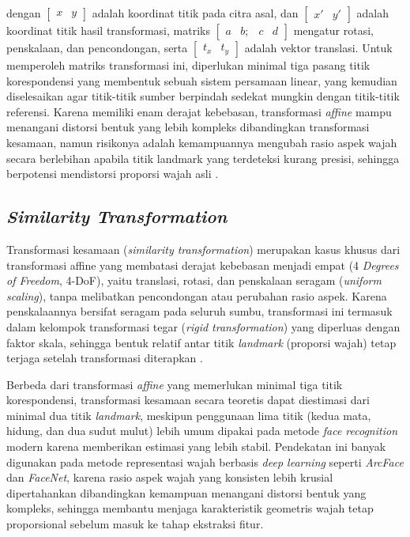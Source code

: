 dengan $\begin{bmatrix} x & y \end{bmatrix}$ adalah koordinat titik pada citra asal, dan $\begin{bmatrix} x' & y' \end{bmatrix}$ adalah koordinat titik hasil transformasi, matriks $\begin{bmatrix} a & b; & c & d \end{bmatrix}$ mengatur rotasi, penskalaan, dan pencondongan, serta $\begin{bmatrix} t_x & t_y \end{bmatrix}$ adalah vektor translasi. Untuk memperoleh matriks transformasi ini, diperlukan minimal tiga pasang titik korespondensi yang membentuk sebuah sistem persamaan linear, yang kemudian diselesaikan agar titik-titik sumber berpindah sedekat mungkin dengan titik-titik referensi. Karena memiliki enam derajat kebebasan, transformasi \textit{affine} mampu menangani distorsi bentuk yang lebih kompleks dibandingkan transformasi kesamaan, namun risikonya adalah kemampuannya mengubah rasio aspek wajah secara berlebihan apabila titik landmark yang terdeteksi kurang presisi, sehingga berpotensi mendistorsi proporsi wajah asli \autocite{wang2021deep,Zhao2003}.

\subsection{\textit{Similarity Transformation}}

Transformasi kesamaan (\textit{similarity transformation}) merupakan kasus khusus dari transformasi affine yang membatasi derajat kebebasan menjadi empat (4 \textit{Degrees of Freedom}, 4-DoF), yaitu translasi, rotasi, dan penskalaan seragam (\textit{uniform scaling}), tanpa melibatkan pencondongan atau perubahan rasio aspek. Karena penskalaannya bersifat seragam pada seluruh sumbu, transformasi ini termasuk dalam kelompok transformasi tegar (\textit{rigid transformation}) yang diperluas dengan faktor skala, sehingga bentuk relatif antar titik \textit{landmark} (proporsi wajah) tetap terjaga setelah transformasi diterapkan \autocite{wang2021deep}.

Berbeda dari transformasi \textit{affine} yang memerlukan minimal tiga titik korespondensi, transformasi kesamaan secara teoretis dapat diestimasi dari minimal dua titik \textit{landmark}, meskipun penggunaan lima titik (kedua mata, hidung, dan dua sudut mulut) lebih umum dipakai pada metode \textit{face recognition} modern karena memberikan estimasi yang lebih stabil. Pendekatan ini banyak digunakan pada metode representasi wajah berbasis \textit{deep learning} seperti \textit{ArcFace} dan \textit{FaceNet}, karena rasio aspek wajah yang konsisten lebih krusial dipertahankan dibandingkan kemampuan menangani distorsi bentuk yang kompleks, sehingga membantu menjaga karakteristik geometris wajah tetap proporsional sebelum masuk ke tahap ekstraksi fitur.

